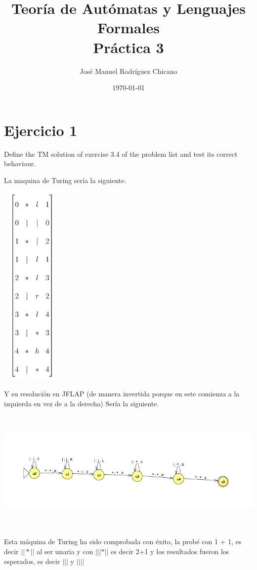 \documentclass[fleqn, 10pt]{article}
\title{Teoría de Autómatas y Lenguajes Formales\\[.4\baselineskip]Práctica 3}
\author{José Manuel Rodríguez Chicano}
\date{\today}
\theoremstyle{plain}
\theoremstyle{definition}
\begin{document}
\maketitle

\section{Ejercicio 1}

Define the TM solution of exercise 3.4 of the problem list and test its correct
behaviour.

La maquina de Turing sería la siguiente.
\begin{center}
\includegraphics[width=3cm, height=10cm]{Turing.png}
\end{center}
Y su resolución en JFLAP (de manera invertida porque en este comienza a la izquierda en vez de a la derecha) Sería la siguiente.
\begin{center}
\includegraphics[width=15cm, height=6cm]{JFLAP.png}
\end{center}
Esta máquina de Turing ha sido comprobada con éxito, la probé con 1 + 1, es decir $||*||$ al ser unaria y con $|||*||$ es decir 2+1 y los resultados fueron los esperados, es decir $|||$ y $||||$
\end{document}
